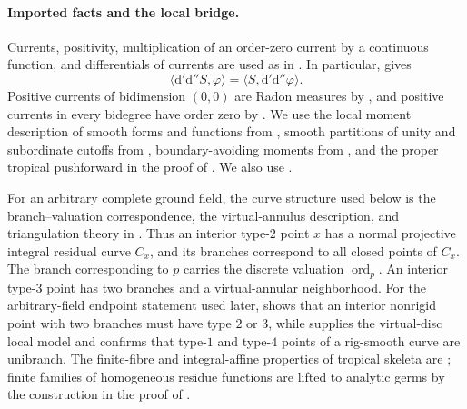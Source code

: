 
\paragraph{Imported facts and the local bridge.}
Currents, positivity, multiplication of an order-zero current by a
continuous function, and differentials of currents are used as in
\cite[\S\S7.1--7.2, Example~7.2.12, and \S7.7]{CLD25}.  In particular,
\cite[Lemma~7.7.5]{CLD25} gives
\begin{equation}
\label{eq:p21p3-gfc-transpose-dd}
 \bigl\langle \mathrm d'\mathrm d''S,\varphi\bigr\rangle
 =
 \bigl\langle S,\mathrm d'\mathrm d''\varphi\bigr\rangle .
\end{equation}
Positive currents of bidimension $(0,0)$ are Radon measures by
\cite[Proposition~7.2.8]{CLD25}, and positive currents in every bidegree
have order zero by \cite[Proposition~7.2.9]{CLD25}.  We use the local
moment description of smooth forms and functions from
\cite[Proposition~15.1.1(b) and Corollary~15.1.2]{CLD25}, smooth
partitions of unity and subordinate cutoffs from
\cite[Corollary~15.2.4, Proposition~15.2.8, and
Corollary~15.2.9]{CLD25}, boundary-avoiding moments from
\cite[Lemma~12.3.6]{CLD25}, and the proper tropical pushforward in the
proof of \cite[Theorem~16.8.5]{CLD25}.  We also use
\cite[Proposition~3.3.6, Lemma~12.3.6, Theorem~12.2.4,
Corollary~12.2.5, \S14.3.2, Lemma~14.3.4,
Proposition~14.4.2, \S16.6, and Proposition~16.6.3]{CLD25}.

For an arbitrary complete ground field, the curve structure used below is
the branch--valuation correspondence, the virtual-annulus description,
and triangulation theory in
\cite[\S\S3.3.5.2, 4.2.6, 4.2.9, 4.2.10--4.2.11, and
4.3.9--4.3.10]{Ducros24CurveStructure}.  Thus an interior
type-$2$ point $x$ has a normal projective integral residual curve
$C_x$, and its branches correspond to all closed points of $C_x$.
The branch corresponding to $p$ carries the discrete valuation
$\operatorname{ord}_p$.  An interior type-$3$ point has two branches
and a virtual-annular neighborhood.  For the arbitrary-field endpoint
statement used later, \cite[Theorem~4.2.5]{Ducros24CurveStructure}
shows that an interior nonrigid point with two branches must have type
$2$ or $3$, while \cite[Theorem~4.5.4, especially \S4.5.4.1, and
\S4.5.19.1]{Ducros24CurveStructure} supplies the virtual-disc local
model and confirms that type-$1$ and type-$4$ points of a rig-smooth
curve are unibranch.  The finite-fibre and integral-affine
properties of tropical skeleta are
\cite[Corollary~3.18 and Remark~3.20]{GJR26}; finite families of
homogeneous residue functions are lifted to analytic germs by the
construction in the proof of \cite[Lemma~6.14]{GJR26}.

